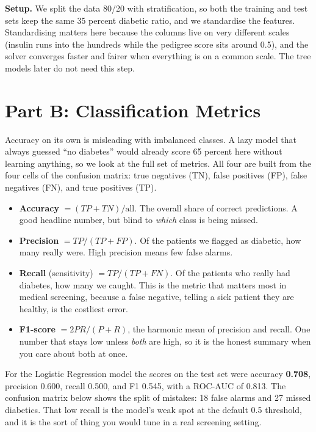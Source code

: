 \documentclass[11pt,a4paper]{article}
\begin{document}
\textbf{Setup.} We split the data 80/20 with stratification, so both the training
and test sets keep the same 35 percent diabetic ratio, and we standardise the
features. Standardising matters here because the columns live on very different
scales (insulin runs into the hundreds while the pedigree score sits around 0.5),
and the solver converges faster and fairer when everything is on a common scale.
The tree models later do not need this step.

\section*{Part B: Classification Metrics}

Accuracy on its own is misleading with imbalanced classes. A lazy model that
always guessed ``no diabetes'' would already score 65 percent here without
learning anything, so we look at the full set of metrics. All four are built from
the four cells of the confusion matrix: true negatives (TN), false positives (FP),
false negatives (FN), and true positives (TP).

\begin{itemize}
    \item \textbf{Accuracy} $=(TP+TN)/\text{all}$. The overall share of correct
    predictions. A good headline number, but blind to \emph{which} class is being
    missed.
    \item \textbf{Precision} $=TP/(TP+FP)$. Of the patients we flagged as
    diabetic, how many really were. High precision means few false alarms.
    \item \textbf{Recall} (sensitivity) $=TP/(TP+FN)$. Of the patients who really
    had diabetes, how many we caught. This is the metric that matters most in
    medical screening, because a false negative, telling a sick patient they are
    healthy, is the costliest error.
    \item \textbf{F1-score} $=2PR/(P+R)$, the harmonic mean of precision and
    recall. One number that stays low unless \emph{both} are high, so it is the
    honest summary when you care about both at once.
\end{itemize}

For the Logistic Regression model the scores on the test set were accuracy
\textbf{0.708}, precision 0.600, recall 0.500, and F1 0.545, with a ROC-AUC of
0.813. The confusion matrix below shows the split of mistakes: 18 false alarms and
27 missed diabetics. That low recall is the model's weak spot at the default 0.5
threshold, and it is the sort of thing you would tune in a real screening setting.
\end{document}
